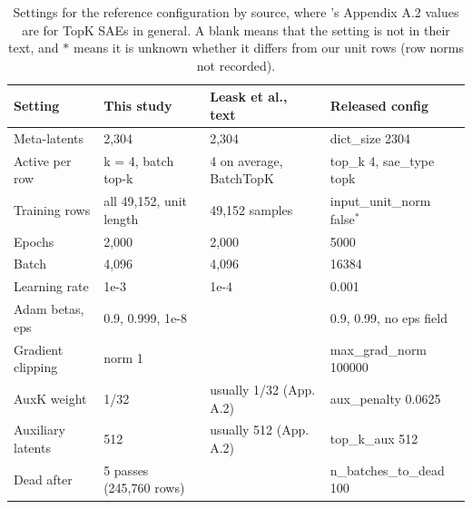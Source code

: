\begin{table}[!htbp]
  \caption{Settings for the reference configuration by source, where \citeauthor{leask2025canonical}'s Appendix A.2 values are for TopK SAEs in general. A blank means that the setting is not in their text, and $\ast$ means it is unknown whether it differs from our unit rows (row norms not recorded).}
  \label{tab:app-settings}
  \centering
  \small
  \begin{tabular}{@{}llll@{}}
    \toprule
    Setting & This study & Leask et al., text & Released config \\
    \midrule
    Meta-latents & 2,304 & 2,304 & dict\_size 2304 \\
    Active per row & k = 4, batch top-k & 4 on average, BatchTopK & top\_k 4, sae\_type topk \\
    Training rows & all 49,152, unit length & 49,152 samples & input\_unit\_norm false$^\ast$ \\
    Epochs & 2,000 & 2,000 & 5000 \\
    Batch & 4,096 & 4,096 & 16384 \\
    Learning rate & 1e-3 & 1e-4 & 0.001 \\
    Adam betas, eps & 0.9, 0.999, 1e-8 & & 0.9, 0.99, no eps field \\
    Gradient clipping & norm 1 & & max\_grad\_norm 100000 \\
    AuxK weight & 1/32 & usually 1/32 (App. A.2) & aux\_penalty 0.0625 \\
    Auxiliary latents & 512 & usually 512 (App. A.2) & top\_k\_aux 512 \\
    Dead after & 5 passes (245,760 rows) & & n\_batches\_to\_dead 100 \\
    \bottomrule
  \end{tabular}
\end{table}

\FloatBarrier
